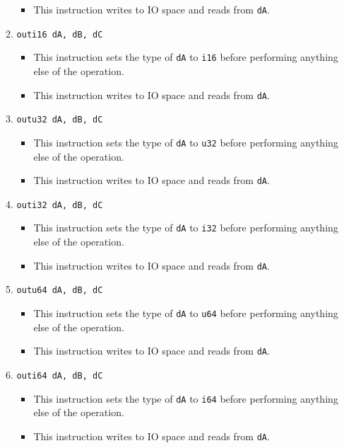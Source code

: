 \documentclass{article}
\begin{document}
\begin{itemize}
\begin{enumerate}
\begin{itemize}
				\item This instruction writes to IO space and reads from
				\texttt{dA}.
				\end{itemize}
			\item \texttt{outi16 dA, dB, dC}
				\begin{itemize}
				\item This instruction sets the type of \texttt{dA} to
				\texttt{i16} before performing anything else of the
				operation.

				\item This instruction writes to IO space and reads from
				\texttt{dA}.
				\end{itemize}

			\item \texttt{outu32 dA, dB, dC}
				\begin{itemize}
				\item This instruction sets the type of \texttt{dA} to
				\texttt{u32} before performing anything else of the
				operation.

				\item This instruction writes to IO space and reads from
				\texttt{dA}.
				\end{itemize}
			\item \texttt{outi32 dA, dB, dC}
				\begin{itemize}
				\item This instruction sets the type of \texttt{dA} to
				\texttt{i32} before performing anything else of the
				operation.

				\item This instruction writes to IO space and reads from
				\texttt{dA}.
				\end{itemize}
			\item \texttt{outu64 dA, dB, dC}
				\begin{itemize}
				\item This instruction sets the type of \texttt{dA} to
				\texttt{u64} before performing anything else of the
				operation.

				\item This instruction writes to IO space and reads from
				\texttt{dA}.
				\end{itemize}
			\item \texttt{outi64 dA, dB, dC}
				\begin{itemize}
				\item This instruction sets the type of \texttt{dA} to
				\texttt{i64} before performing anything else of the
				operation.

				\item This instruction writes to IO space and reads from
				\texttt{dA}.
				\end{itemize}
			\end{enumerate}
		\end{itemize}



\end{document}
